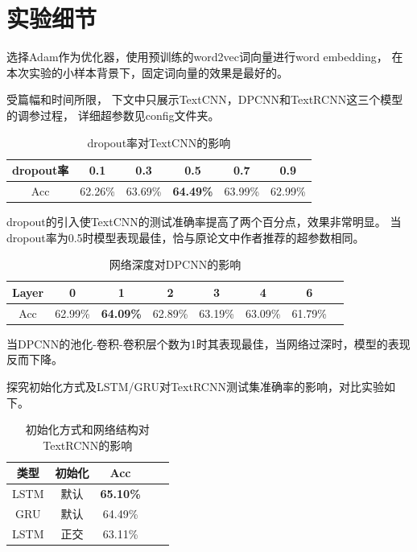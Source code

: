 \documentclass[12pt, UTF8, a4paper]{ctexart}
\begin{document}
\section{实验细节}

选择Adam作为优化器，使用预训练的word2vec词向量进行word embedding，
在本次实验的小样本背景下，固定词向量的效果是最好的。

受篇幅和时间所限，
下文中只展示TextCNN，DPCNN和TextRCNN这三个模型的调参过程，
详细超参数见config文件夹。

\begin{table}[htbp]
    \centering
    \caption{dropout率对TextCNN的影响}
    \begin{tabular}{cccccc}
        \toprule
        dropout率 & 0.1 & 0.3 & 0.5 & 0.7 & 0.9 \\
        \midrule
        Acc & 62.26\% & 63.69\% & \textbf{64.49\%} & 63.99\% & 62.99\% \\
        \bottomrule
    \end{tabular}
\end{table}

dropout的引入使TextCNN的测试准确率提高了两个百分点，效果非常明显。
当dropout率为0.5时模型表现最佳，恰与原论文中作者推荐的超参数相同。

\begin{table}[htbp]
    \centering
    \caption{网络深度对DPCNN的影响}
    \begin{tabular}{cccccccc}
    \toprule
        Layer & 0 & 1 & 2 & 3 & 4 & 6 \\ 
    \midrule
        Acc & 62.99\% &\textbf{64.09\%} & 62.89\% & 63.19\% & 63.09\% & 61.79\% \\ 
    \bottomrule
    \end{tabular}
\end{table}

当DPCNN的池化-卷积-卷积层个数为1时其表现最佳，当网络过深时，模型的表现反而下降。

探究初始化方式及LSTM/GRU对TextRCNN测试集准确率的影响，对比实验如下。

\begin{table}[htbp]
    \centering
    \caption{初始化方式和网络结构对TextRCNN的影响}
    \begin{tabular}{ccccc}
        \toprule
        类型 & 初始化 & Acc  \\ 
        \midrule
        LSTM & 默认 & \textbf{65.10\%}  \\ 
        GRU & 默认 & 64.49\%  \\ 
        LSTM & 正交 & 63.11\% \\ 
        \bottomrule
    \end{tabular}
\end{table}
\end{document}
